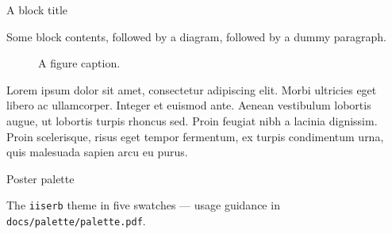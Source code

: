 
\begin{columns}[t]
\separatorcolumn

\begin{column}{\colwidth}

  \begin{block}{A block title}

    Some block contents, followed by a diagram, followed by a dummy paragraph.

    \begin{figure}
      \centering
      \caption{A figure caption.}
    \end{figure}

    Lorem ipsum dolor sit amet, consectetur adipiscing elit. Morbi ultricies
    eget libero ac ullamcorper. Integer et euismod ante. Aenean vestibulum
    lobortis augue, ut lobortis turpis rhoncus sed. Proin feugiat nibh a
    lacinia dignissim. Proin scelerisque, risus eget tempor fermentum, ex
    turpis condimentum urna, quis malesuada sapien arcu eu purus.

  \end{block}

  \begin{block}{Poster palette}

    The \texttt{iiserb} theme in five swatches — usage guidance in
    \texttt{docs/palette/palette.pdf}.

    \begin{center}
    \end{center}


\end{block}
\end{column}
\end{columns}
